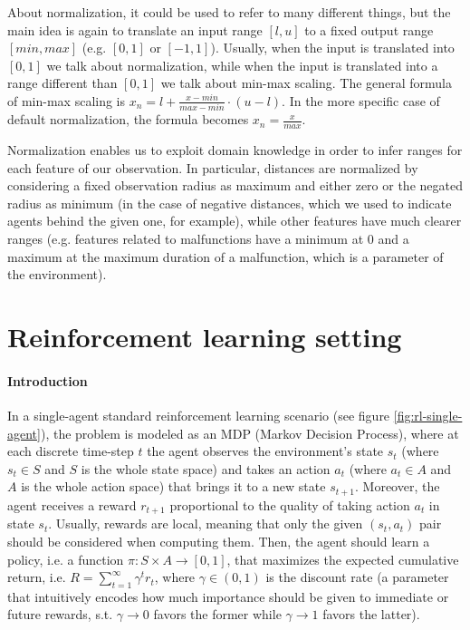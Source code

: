 \documentclass[a4paper,10pt]{report}
\begin{document}
About normalization, it could be used to refer to many different things, but the main idea is again to translate an input range $[l, u]$ to a fixed output range $[min, max]$ (e.g. $[0, 1]$ or $[-1,1]$). Usually, when the input is translated into $[0,1]$ we talk about normalization, while when the input is translated into a range different than $[0,1]$ we talk about min-max scaling. The general formula of min-max scaling is $x_n = l + \frac{x - min}{max - min} \cdot (u - l)$. In the more specific case of default normalization, the formula becomes $x_n = \frac{x}{max}$. 

Normalization enables us to exploit domain knowledge in order to infer ranges for each feature of our observation. In particular, distances are normalized by considering a fixed observation radius as maximum and either zero or the negated radius as minimum (in the case of negative distances, which we used to indicate agents behind the given one, for example), while other features have much clearer ranges (e.g. features related to malfunctions have a minimum at $0$ and a maximum at the maximum duration of a malfunction, which is a parameter of the environment).

\chapter{Reinforcement learning setting}
\subsubsection*{Introduction}
In a single-agent standard reinforcement learning scenario (see figure \ref{fig:rl-single-agent}), the problem is modeled as an MDP (Markov Decision Process), where at each discrete time-step $t$ the agent observes the environment's state $s_t$ (where $s_t \in S$ and $S$ is the whole state space) and takes an action $a_t$ (where $a_t \in A$ and $A$ is the whole action space) that brings it to a new state $s_{t+1}$. Moreover, the agent receives a reward $r_{t+1}$ proportional to the quality of taking action $a_t$ in state $s_t$. Usually, rewards are local, meaning that only the given $(s_t, a_t)$ pair should be considered when computing them. Then, the agent should learn a policy, i.e. a function $\pi: S\times A \rightarrow [0,1]$, that maximizes the expected cumulative return, i.e. $R=\sum_{t=1}^{\infty}\gamma^t r_t$, where $\gamma\in(0,1)$ is the discount rate (a parameter that intuitively encodes how much importance should be given to immediate or future rewards, s.t. $\gamma \rightarrow 0$ favors the former while $\gamma \rightarrow 1$ favors the latter).
\end{document}

